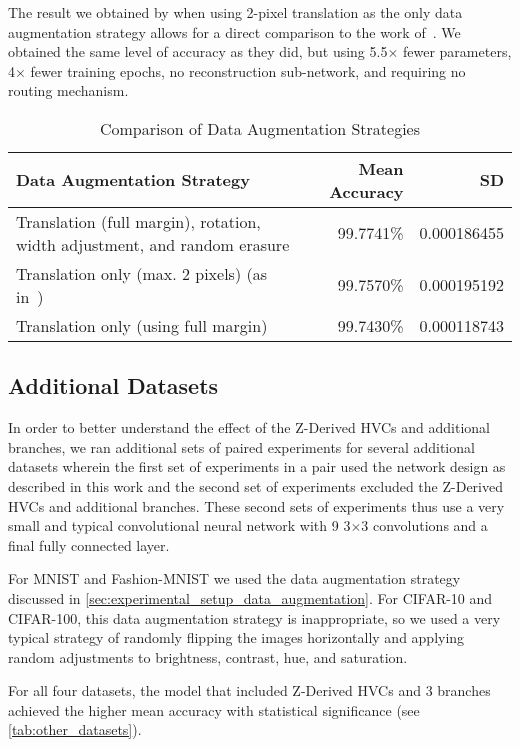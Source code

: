 \documentclass{article}
\begin{document}
The result we obtained by when using 2-pixel translation as the only data augmentation strategy allows for a direct comparison to the work of~\cite{Sabour2017}.  We obtained the same level of accuracy as they did, but using 5.5\(\times{}\) fewer parameters, 4\(\times{}\) fewer training epochs, no reconstruction sub-network, and requiring no routing mechanism.

\begin{table}[!ht]
  \caption{Comparison of Data Augmentation Strategies}
  \centering
  \begin{tabularx}{\textwidth}{@{}Xrr@{}}
    \toprule
    	Data Augmentation Strategy & Mean Accuracy & SD \\
    \midrule
      Translation (full margin), rotation, width adjustment, and random erasure & 99.7741\% & 0.000186455 \\
      Translation only (max. 2 pixels) (as in~\cite{Sabour2017}) & 99.7570\% & 0.000195192 \\
      Translation only (using full margin) & 99.7430\% & 0.000118743 \\
    \bottomrule
  \end{tabularx}\label{tab:augmentation_strategies}
\end{table}

\subsection{Additional Datasets}

In order to better understand the effect of the Z-Derived HVCs and additional branches, we ran additional sets of paired experiments for several additional datasets wherein the first set of experiments in a pair used the network design as described in this work and the second set of experiments excluded the Z-Derived HVCs and additional branches.  These second sets of experiments thus use a very small and typical convolutional neural network with 9 3\(\times{}\)3 convolutions and a final fully connected layer.

For MNIST and Fashion-MNIST we used the data augmentation strategy discussed in \autoref{sec:experimental_setup_data_augmentation}.  For CIFAR-10 and CIFAR-100, this data augmentation strategy is inappropriate, so we used a very typical strategy of randomly flipping the images horizontally and applying random adjustments to brightness, contrast, hue, and saturation.

For all four datasets, the model that included Z-Derived HVCs and 3 branches achieved the higher mean accuracy with statistical significance (see \autoref{tab:other_datasets}).
\end{document}

